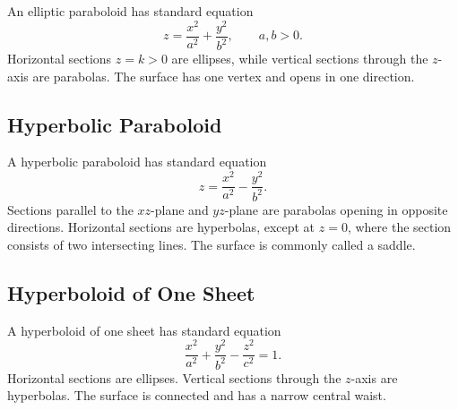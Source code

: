 An elliptic paraboloid has standard equation
\[
z=\frac{x^2}{a^2}+\frac{y^2}{b^2},
\qquad a,b>0.
\]
Horizontal sections $z=k>0$ are ellipses, while vertical sections through the
$z$-axis are parabolas. The surface has one vertex and opens in one direction.

\begin{center}
\end{center}

\subsection{Hyperbolic Paraboloid}

A hyperbolic paraboloid has standard equation
\[
z=\frac{x^2}{a^2}-\frac{y^2}{b^2}.
\]
Sections parallel to the $xz$-plane and $yz$-plane are parabolas opening in
opposite directions. Horizontal sections are hyperbolas, except at $z=0$, where
the section consists of two intersecting lines. The surface is commonly called
a saddle.

\begin{center}
\end{center}

\subsection{Hyperboloid of One Sheet}

A hyperboloid of one sheet has standard equation
\[
\frac{x^2}{a^2}+\frac{y^2}{b^2}-\frac{z^2}{c^2}=1.
\]
Horizontal sections are ellipses. Vertical sections through the $z$-axis are
hyperbolas. The surface is connected and has a narrow central waist.

